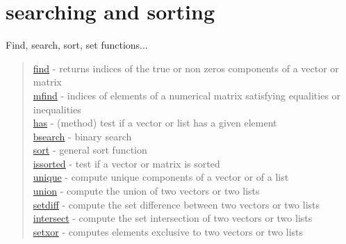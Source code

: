 \chapter*{searching and sorting}

Find, search, sort, set functions...

\begin{quote}
\noindent
\hyperlink{find}{find} - returns indices of the true or non zeros
components of a vector or matrix \\
\hyperlink{mfind}{mfind} - indices of elements of a numerical matrix satisfying equalities or inequalities\\
\hyperlink{has}{has} - (method) test if a vector or list has a given element\\
\hyperlink{bsearch}{bsearch} - binary search \\
\hyperlink{sort}{sort} - general sort function \\
\hyperlink{issorted}{issorted} - test if a vector or matrix is sorted \\
\hyperlink{unique}{unique} - compute unique components of a vector or of a list \\
\hyperlink{union}{union} - compute the union of two vectors or two lists \\
\hyperlink{setdiff}{setdiff} - compute the set difference between two vectors or two lists\\
\hyperlink{intersect}{intersect} - compute the set intersection of two vectors or two lists\\
\hyperlink{setxor}{setxor} - computes elements exclusive to two vectors or two lists\\
\end{quote}

 
 
 
 
 

 
 
 
  
 
